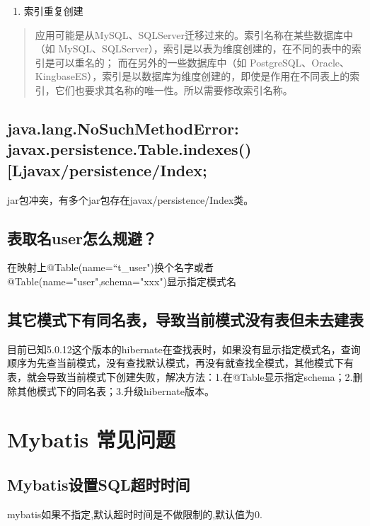 \documentclass[letterpaper,10pt,english]{sphinxmanual}
\begin{document}
\begin{enumerate}
%
\item {} 
索引重复创建

\end{enumerate}
\begin{quote}

应用可能是从MySQL、SQLServer迁移过来的。索引名称在某些数据库中（如 MySQL、SQLServer），索引是以表为维度创建的，在不同的表中的索引是可以重名的； 而在另外的一些数据库中（如 PostgreSQL、Oracle、KingbaseES），索引是以数据库为维度创建的，即使是作用在不同表上的索引，它们也要求其名称的唯一性。所以需要修改索引名称。
\end{quote}


\subsection{java.lang.NoSuchMethodError: javax.persistence.Table.indexes(){[}Ljavax/persistence/Index;}
\label{\detokenize{interface/hibernate:java-lang-nosuchmethoderror-javax-persistence-table-indexes-ljavax-persistence-index}}
jar包冲突，有多个jar包存在javax/persistence/Index类。


\subsection{表取名user怎么规避？}
\label{\detokenize{interface/hibernate:user}}
在映射上@Table(name=“t\_user")换个名字或者@Table(name="user",schema="xxx")显示指定模式名


\subsection{其它模式下有同名表，导致当前模式没有表但未去建表}
\label{\detokenize{interface/hibernate:id2}}
目前已知5.0.12这个版本的hibernate在查找表时，如果没有显示指定模式名，查询顺序为先查当前模式，没有查找默认模式，再没有就查找全模式，其他模式下有表，就会导致当前模式下创建失败，解决方法：1.在@Table显示指定schema；2.删除其他模式下的同名表；3.升级hibernate版本。


\section{Mybatis 常见问题}
\label{\detokenize{interface/mybatis:mybatis}}\label{\detokenize{interface/mybatis::doc}}

\subsection{Mybatis设置SQL超时时间}
\label{\detokenize{interface/mybatis:mybatissql}}
mybatis如果不指定,默认超时时间是不做限制的,默认值为0.
\end{document}
